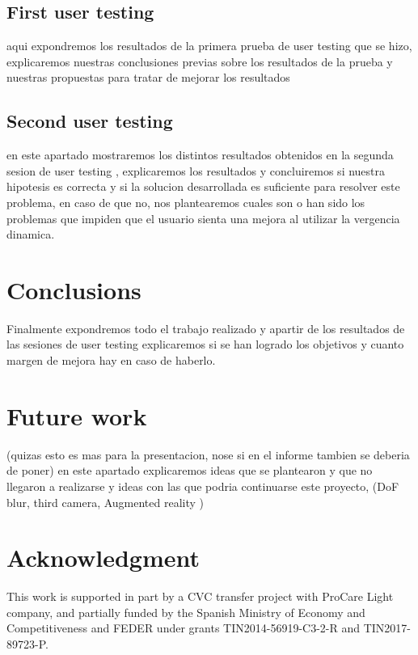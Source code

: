 \documentclass[10pt,a4paper,twocolumn,twoside]{article}
\begin{document}
	\subsection{First user testing}
	aqui expondremos los resultados de la primera prueba de user testing que se hizo, explicaremos nuestras conclusiones previas sobre los resultados de la prueba y nuestras propuestas para tratar de mejorar los resultados
	
	\subsection{Second user testing}
	en este apartado mostraremos los distintos resultados obtenidos en la segunda sesion de user testing , explicaremos los resultados y concluiremos si nuestra hipotesis es correcta y si la solucion desarrollada es suficiente para resolver este problema, en caso de que no, nos plantearemos cuales son o han sido los problemas que impiden que el usuario sienta una mejora al utilizar la vergencia dinamica.
	
	\section{Conclusions}
	Finalmente expondremos todo el trabajo realizado y apartir de los resultados de las sesiones de user testing explicaremos si se han logrado los objetivos y cuanto margen de mejora hay en caso de haberlo. 
	
	\section{Future work}
	(quizas esto es mas para la presentacion, nose si en el informe tambien se deberia de poner)
	en este apartado explicaremos ideas que se plantearon y que no llegaron a realizarse y ideas con las que podria continuarse este proyecto, (DoF blur, third camera, Augmented reality )
	
	\section*{Acknowledgment}
	This work is supported in part by a CVC transfer project with ProCare Light company, and partially funded by the Spanish Ministry of Economy and Competitiveness and FEDER under grants TIN2014-56919-C3-2-R and TIN2017-89723-P.
	
	
	
	
\end{document}
